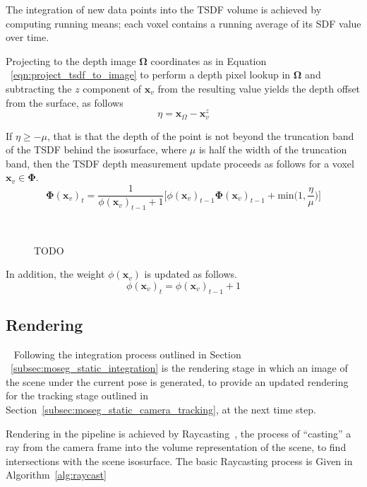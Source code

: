 The integration of new data points into the TSDF volume is achieved by computing 
running means; each voxel contains a running average of its SDF value over time.

Projecting to the depth image \(\bm{\Omega}\) coordinates as in Equation
~\ref{eqn:project_tsdf_to_image} to perform a depth pixel lookup in \(\bm{\Omega}\)
and subtracting the \(z\) component of \(\bm{x}_{v}\) from the resulting value
yields the depth offset from the surface, as follows
\begin{equation}
  \label{eqn:integration_offset}
  \eta = \bm{x}_{\Omega} - \bm{x}_{v}^{z}
\end{equation}

If \( \eta \geq -\mu \), that is that the depth of the point is not beyond the
truncation band of the TSDF behind the isosurface, where \( \mu \) is half the 
width of the truncation band, then the TSDF depth measurement update 
proceeds as follows for a voxel \(\bm{x}_{v} \in \bm{\Phi}\).
\begin{equation}
\label{eqn:sdf_update}
\bm{\Phi}{(\bm{x}_{v})}_{t} = \frac{1}{\phi{(\bm{x}_{v})}_{t-1} + 1}
\bigg[\phi{(\bm{x}_{v})}_{t-1}\bm{\bm{\Phi}}{(\bm{x}_{v})}_{t-1} +
\text{min} \bigg( 1, \frac{\eta}{\mu} \bigg)
\bigg]
\end{equation}

\begin{figure}[!htbp]
  \caption{TODO}
~\label{figure:truncation_band}
\end{figure}

In addition, the weight \(\phi(\bm{x}_{v})\) is updated as follows.
\begin{equation}
  \label{eqn:sdf_weight_update}
  \phi{(\bm{x}_{v})}_{t} = \phi{(\bm{x}_{v})}_{t-1} + 1
\end{equation}

\subsection{Rendering}
~\label{subsec:moseg_static_rendering}
Following the integration process outlined in Section ~\ref{subsec:moseg_static_integration} 
is the rendering stage in which an image of the scene under the current pose is generated, to 
provide an updated rendering for the tracking stage outlined in Section~\ref{subsec:moseg_static_camera_tracking}, 
at the next time step.

Rendering in the pipeline is achieved by Raycasting~\cite{Roth1982}, the process of 
``casting'' a ray from the camera frame into the volume representation of the scene, to find intersections with 
the scene isosurface. The basic Raycasting process is Given in Algorithm~\ref{alg:raycast}

